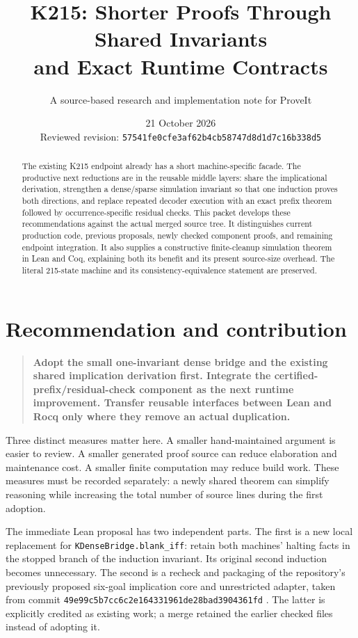 \documentclass[11pt,letterpaper]{article}
\title{\textbf{K215: Shorter Proofs Through Shared Invariants\\and Exact Runtime Contracts}}
\author{A source-based research and implementation note for ProveIt}
\date{21 October 2026\\\small Reviewed revision: \texttt{57541fe0cfe3af62b4cb58747d8d1d7c16b338d5}}
\newcommand{\code}[1]{\texttt{#1}}
\newenvironment{recommendation}{\begin{quote}\color{blue!35!black}\bfseries}{\end{quote}}
\begin{document}
\maketitle
\begin{abstract}
The existing K215 endpoint already has a short machine-specific facade. The productive
next reductions are in the reusable middle layers: share the implicational derivation,
strengthen a dense/sparse simulation invariant so that one induction proves both
directions, and replace repeated decoder execution with an exact prefix theorem followed
by occurrence-specific residual checks. This packet develops these recommendations
against the actual merged source tree. It distinguishes current production code,
previous proposals, newly checked component proofs, and remaining endpoint integration.
It also supplies a constructive finite-cleanup simulation theorem in Lean and Coq,
explaining both its benefit and its present source-size overhead. The literal 215-state
machine and its consistency-equivalence statement are preserved.
\end{abstract}

\section{Recommendation and contribution}

\begin{recommendation}
Adopt the small one-invariant dense bridge and the existing shared implication
derivation first. Integrate the certified-prefix/residual-check component as the next
runtime improvement. Transfer reusable interfaces between Lean and Rocq only where
they remove an actual duplication.
\end{recommendation}

Three distinct measures matter here. A smaller hand-maintained argument is easier to
review. A smaller generated proof source can reduce elaboration and maintenance cost.
A smaller finite computation may reduce build work. These measures must be recorded
separately: a newly shared theorem can simplify reasoning while increasing the total
number of source lines during the first adoption.

The immediate Lean proposal has two independent parts. The first is a new local
replacement for \code{KDenseBridge.blank\_iff}: retain both machines' halting facts in
the stopped branch of the induction invariant. Its original second induction becomes
unnecessary. The second is a recheck and packaging of the repository's previously
proposed six-goal implication core and unrestricted adapter, taken from commit
\code{49e99c5b7cc6c2e164331961de28bad3904361fd} \cite{basis}. The latter is explicitly credited as
existing work; a merge retained the earlier checked files instead of adopting it.
\end{document}
